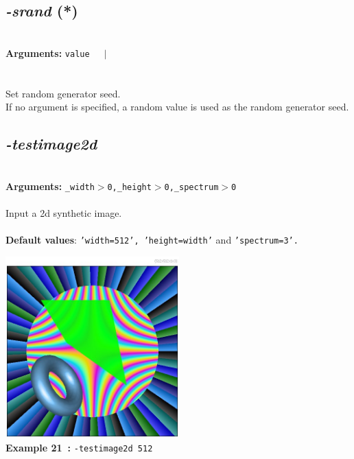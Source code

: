 \documentclass[a4paper,11pt,twoside]{book}
\begin{document}
\subsection{\emph{-srand} (*)}\vspace*{-0.5em}
~\\\textbf{Arguments: } 
{\small \texttt{value}}~~~$|$\\
\\~\\
Set random generator seed.
~\\If no argument is specified, a random value is used as the random generator seed.


\subsection{\emph{-testimage2d} }\vspace*{-0.5em}
~\\\textbf{Arguments: } 
{\small \texttt{\_width$>$0,\_height$>$0,\_spectrum$>$0}}\\~\\
Input a 2d synthetic image.
~\\~\\\textbf{Default values}: {\small \texttt{'width=512', 'height=width'} and \texttt{'spectrum=3'.}}
\begin{center}\includegraphics[keepaspectratio=true,height=7cm,width=\textwidth]{img/gmic_def21.jpg}\\
{\footnotesize \textbf{Example 21~:} \texttt{-testimage2d 512}}
\end{center}
\end{document}
